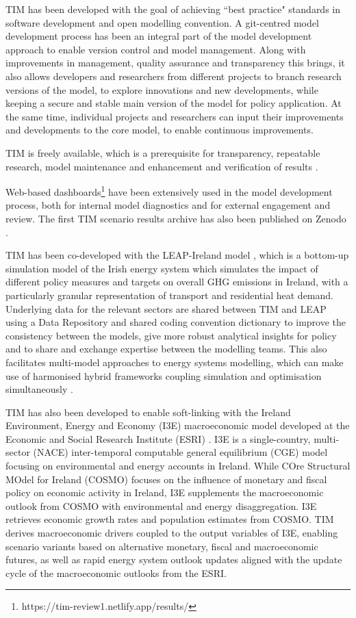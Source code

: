\documentclass[gmd,manuscript]{copernicus}
\begin{document}

TIM has been developed with the goal of achieving ``best practice" standards in software development and open modelling convention. A git-centred model development process has been an integral part of the model development approach to enable version control and model management. Along with improvements in management, quality assurance and transparency this brings, it also allows developers and researchers from different projects to branch research versions of the model, to explore innovations and new developments, while keeping a secure and stable main version of the model for policy application. At the same time, individual projects and researchers can input their improvements and developments to the core model, to enable continuous improvements. 

TIM is freely available, which is a prerequisite for transparency, repeatable research, model maintenance and enhancement and verification of results \citep{Pfenninger2018}. 

Web-based dashboards\footnote{https://tim-review1.netlify.app/results/} have been extensively used in the model development process, both for internal model diagnostics and for external engagement and review. The first TIM scenario results archive has also been published on Zenodo \citep{HannahDaly2021}.

TIM has been co-developed with the LEAP-Ireland model \citep{MacUidhir2020}, which is a bottom-up simulation model of the Irish energy system which simulates the impact of different policy measures and targets on overall GHG emissions in Ireland, with a particularly granular representation of transport and residential heat demand. Underlying data for the relevant sectors are shared between TIM and LEAP using a Data Repository and shared coding convention dictionary to improve the consistency between the models, give more robust analytical insights for policy and to share and exchange expertise between the modelling teams. This also facilitates multi-model approaches to energy systems modelling, which can make use of harmonised hybrid frameworks coupling simulation and optimisation simultaneously \citep{rogan2014leaps}.

TIM has also been developed to enable soft-linking with the Ireland Environment, Energy and Economy (I3E) macroeconomic model developed at the Economic and Social Research Institute (ESRI) \citep{Yakut2020}. I3E is a single-country, multi-sector (NACE) inter-temporal computable general equilibrium (CGE) model focusing on environmental and energy accounts in Ireland. While COre Structural MOdel for Ireland (COSMO) focuses on the influence of monetary and fiscal policy on economic activity in Ireland, I3E supplements the macroeconomic outlook from COSMO with environmental and energy disaggregation. I3E retrieves economic growth rates and population estimates from COSMO. TIM derives macroeconomic drivers coupled to the output variables of I3E, enabling scenario variants based on alternative monetary, fiscal and macroeconomic futures, as well as rapid energy system outlook updates aligned with the update cycle of the macroeconomic outlooks from the ESRI.
\end{document}
